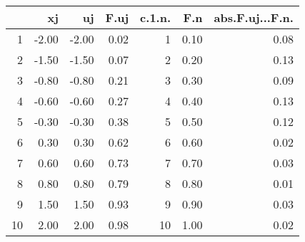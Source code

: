 \begin{table}[ht]
\centering
\begin{tabular}{rrrrrrr}
  \hline
 & xj & uj & F.uj & c.1.n. & F.n & abs.F.uj...F.n. \\ 
  \hline
1 & -2.00 & -2.00 & 0.02 &   1 & 0.10 & 0.08 \\ 
  2 & -1.50 & -1.50 & 0.07 &   2 & 0.20 & 0.13 \\ 
  3 & -0.80 & -0.80 & 0.21 &   3 & 0.30 & 0.09 \\ 
  4 & -0.60 & -0.60 & 0.27 &   4 & 0.40 & 0.13 \\ 
  5 & -0.30 & -0.30 & 0.38 &   5 & 0.50 & 0.12 \\ 
  6 & 0.30 & 0.30 & 0.62 &   6 & 0.60 & 0.02 \\ 
  7 & 0.60 & 0.60 & 0.73 &   7 & 0.70 & 0.03 \\ 
  8 & 0.80 & 0.80 & 0.79 &   8 & 0.80 & 0.01 \\ 
  9 & 1.50 & 1.50 & 0.93 &   9 & 0.90 & 0.03 \\ 
  10 & 2.00 & 2.00 & 0.98 &  10 & 1.00 & 0.02 \\ 
   \hline
\end{tabular}
\end{table}

